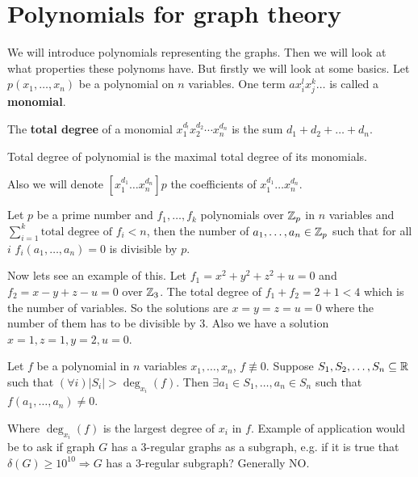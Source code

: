 \chapter{Polynomials for graph theory}

We will introduce polynomials representing the graphs. Then we will look at what properties these polynoms have. But firstly we will look at some basics. Let $p(x_{1}, \dots, x_{n})$ be a polynomial on $n$ variables. One term $ax_{i}^{l} x_{j}^k \dots$ is called a \textbf{monomial}.

\begin{defn}
	The \textbf{total degree} of a monomial $x_{1}^{d_{!}} x_{2}^{d_{2}} \cdots x_{n}^{d_{n}}$ is the sum $d_{1} + d_{2} + \dots + d_{n}$.
\end{defn}

\begin{defn}
	Total degree of polynomial is the maximal total degree of its monomials.
\end{defn}

Also we will denote $[x_{1}^{d_{1}} \dots x_{n}^{d_{n}}]p$ the coefficients of $x_{1}^{d_{1}} \dots x_{n}^{d_{n}}$.

\begin{thm}
	Let $p$ be a prime number and $f_{1}, \dots, f_{k}$ polynomials over $\mathbb{Z}_{p}$ in $n$ variables and $\sum_{i = 1}^{k} \text{total degree of } f_{i} < n$, then the number of $a_{1}, \dots, a_{n} \in \mathbb{Z}_{p}$ such that for all $i$ $f_{i}(a_{1}, \dots, a_{n}) = 0$ is divisible by $p$.
\end{thm}

Now lets see an example of this. Let $f_{1} = x^2 + y^2 + z^2 + u =0$ and $f_{2} = x - y + z - u = 0$ over $\mathbb{Z}_{3}$. The total degree of $f_{1} + f_{2} = 2 + 1 < 4$ which is the number of variables. So the solutions are $x = y = z = u =0$ where the number of them has to be divisible by $3$. Also we have a solution $x = 1, z = 1, y = 2, u =0$.

\begin{thm}
	Let $f$ be a polynomial in $n$ variables $x_{1}, \dots, x_{n}$, $f \not\equiv 0$. Suppose $S_{1}, S_{2}, \dots, S_{n} \subseteq \mathbb{R}$ such that $(\forall i) |S_{i}| > \deg_{x_{i}}(f)$. Then $\exists a_{1} \in S_{1}, \dots, a_{n} \in S_{n}$ such that $f(a_{1}, \dots, a_{n}) \neq 0$.
\end{thm}

Where $\deg_{x_{i}}(f)$ is the largest degree of $x_{i}$ in $f$. Example of application would be to ask if graph $G$ has a $3$-regular graphs as a subgraph, e.g. if it is true that $\delta(G) \geq 10^{10} \Rightarrow G$ has a $3$-regular subgraph? Generally NO.

